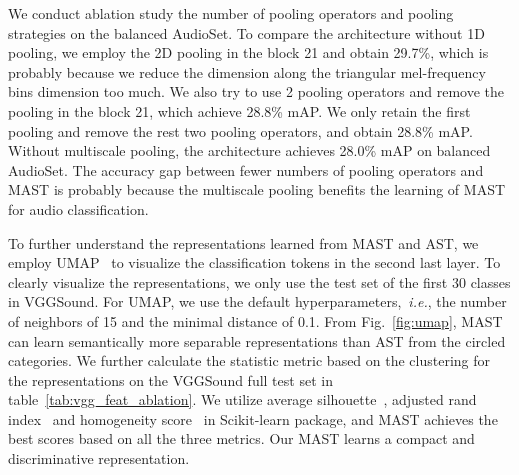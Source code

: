\documentclass{article}
\def\ie{\emph{i.e.}}
\begin{document}
We conduct ablation study  the number of pooling operators and pooling strategies on the balanced AudioSet. To compare the architecture without 1D pooling, we employ the 2D pooling in the block 21 and obtain 29.7\%, which is probably because we reduce the dimension along the triangular mel-frequency bins dimension too much. We also try to use 2 pooling operators and remove the pooling in the block 21, which achieve 28.8\% mAP. We only retain the first pooling and remove the rest two pooling operators, and obtain 28.8\% mAP. Without multiscale pooling, the architecture achieves 28.0\% mAP on balanced AudioSet. The accuracy gap between fewer numbers of pooling operators and MAST is probably because the multiscale pooling benefits the learning of MAST for audio classification.

To further understand the representations learned from MAST and AST, we employ UMAP~\cite{mcinnes2018umap} to visualize the classification tokens in the second last layer. To clearly visualize the representations, we only use the test set of the first 30 classes in VGGSound. For UMAP, we use the default hyperparameters,~\ie, the number of neighbors of 15 and the minimal distance of 0.1. From Fig.~\ref{fig:umap}, MAST can learn semantically more separable representations than AST from the circled categories. We further calculate the statistic metric based on the clustering for the representations on the VGGSound full test set in table~\ref{tab:vgg_feat_ablation}. We utilize average silhouette~\cite{rousseeuw1987silhouettes}, adjusted rand index~\cite{hubert1985comparing} and homogeneity score~\cite{rosenberg2007v} in Scikit-learn package, and MAST achieves the best scores based on all the three metrics.
Our MAST learns a compact and discriminative representation.
\end{document}
